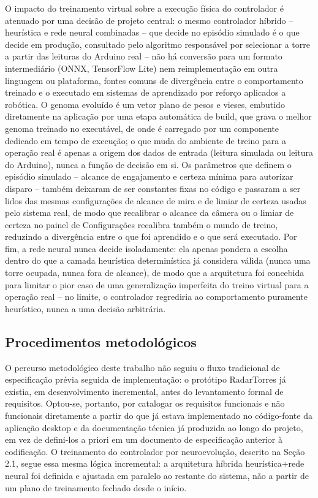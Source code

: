 \documentclass[12pt,a4paper]{article}
\begin{document}
O impacto do treinamento virtual sobre a execução física do controlador é atenuado por uma decisão
de projeto central: o mesmo controlador híbrido -- heurística e rede neural combinadas -- que
decide no episódio simulado é o que decide em produção, consultado pelo algoritmo responsável por
selecionar a torre a partir das leituras do Arduino real -- não há conversão para um formato
intermediário (ONNX, TensorFlow Lite) nem reimplementação em outra linguagem ou plataforma, fontes
comuns de divergência entre o comportamento treinado e o executado em sistemas de aprendizado por
reforço aplicados a robótica. O genoma evoluído é um vetor plano de pesos e vieses, embutido
diretamente na aplicação por uma etapa automática de build, que grava o melhor genoma treinado no
executável, de onde é carregado por um componente dedicado em tempo de execução; o que muda do
ambiente de treino para a operação real é apenas a origem dos dados de entrada (leitura simulada
ou leitura do Arduino), nunca a função de decisão em si. Os parâmetros que definem o episódio
simulado -- alcance de engajamento e certeza mínima para autorizar disparo -- também deixaram de
ser constantes fixas no código e passaram a ser lidos das mesmas configurações de alcance de mira
e de limiar de certeza usadas pelo sistema real, de modo que recalibrar o alcance da câmera ou o
limiar de certeza no painel de Configurações recalibra também o mundo de treino, reduzindo a
divergência entre o que foi aprendido e o que será executado. Por fim, a rede neural nunca decide
isoladamente: ela apenas pondera a escolha dentro do que a camada heurística determinística já
considera válida (nunca uma torre ocupada, nunca fora de alcance), de modo que a arquitetura foi
concebida para limitar o pior caso de uma generalização imperfeita do treino virtual para a
operação real -- no limite, o controlador regrediria ao comportamento puramente heurístico, nunca
a uma decisão arbitrária.


\subsection{Procedimentos metodológicos}
\label{sec:procedimentos-metodologicos}

O percurso metodológico deste trabalho não seguiu o fluxo tradicional de especificação prévia
seguida de implementação: o protótipo RadarTorres já existia, em desenvolvimento incremental,
antes do levantamento formal de requisitos. Optou-se, portanto, por catalogar os requisitos
funcionais e não funcionais diretamente a partir do que já estava implementado no código-fonte da
aplicação desktop e da documentação técnica já produzida ao longo do projeto, em vez de defini-los
a priori em um documento de especificação anterior à codificação. O treinamento do controlador por
neuroevolução, descrito na Seção 2.1, segue essa mesma lógica incremental: a arquitetura híbrida
heurística+rede neural foi definida e ajustada em paralelo ao restante do sistema, não a partir de
um plano de treinamento fechado desde o início.
\end{document}
